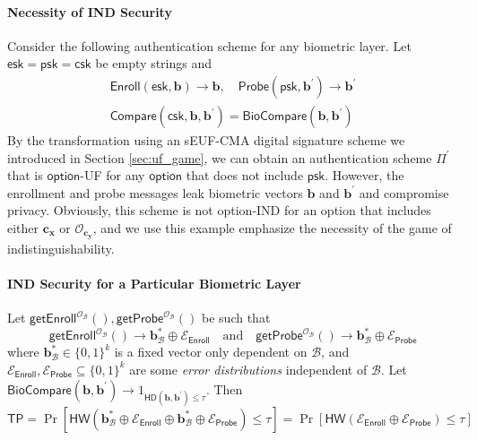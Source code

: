 \paragraph{Necessity of IND Security}
Consider the following authentication scheme for any biometric layer. Let $\textsf{esk} = \textsf{psk} = \textsf{csk}$ be empty strings and
\begin{gather*}
	\textsf{Enroll}(\textsf{esk}, \mathbf{b}) \to \mathbf{b}, \quad \textsf{Probe}(\textsf{psk}, \mathbf{b}^\prime ) \to \mathbf{b}^\prime \\
	\textsf{Compare}(\textsf{csk}, \mathbf{b}, \mathbf{b}^\prime) = \textsf{BioCompare}(\mathbf{b}, \mathbf{b}^\prime ) 
\end{gather*}
By the transformation using an sEUF-CMA digital signature scheme we introduced in Section \ref{sec:uf_game}, we can obtain an authentication scheme $\Pi^\prime$ that is $\textsf{option}$-UF for any $\textsf{option}$ that does not include $\textsf{psk}$.
However, the enrollment and probe messages leak biometric vectors $\mathbf{b}$ and $\mathbf{b}^\prime$ and compromise privacy. Obviously, this scheme is not \textsf{option}-IND for an \textsf{option} that includes either $\mathbf{c_x}$ or $\mathcal{O}_{\mathbf{c_y}}$, and we use this example emphasize the necessity of the game of indistinguishability.


\paragraph{IND Security for a Particular Biometric Layer}

Let $\textsf{getEnroll}^{\mathcal{O}_{\mathcal{B}}}(), \textsf{getProbe}^{\mathcal{O}_{\mathcal{B}}}()$ be such that
\[
	\textsf{getEnroll}^{\mathcal{O}_{\mathcal{B}}}() \to \mathbf{b}^*_{\mathcal{B}} \oplus \mathcal{E}_{\textsf{Enroll}}  \quad \text{and} \quad \textsf{getProbe}^{\mathcal{O}_{\mathcal{B}}}() \to \mathbf{b}^*_{\mathcal{B}} \oplus \mathcal{E}_{\textsf{Probe}}
\]
where $\mathbf{b}^*_{\mathcal{B}} \in \{0, 1\}^k$ is a fixed vector only dependent on $\mathcal{B}$, and $\mathcal{E}_{\textsf{Enroll}}, \mathcal{E}_{\textsf{Probe}} \subseteq \{0, 1\}^k$ are some \emph{error distributions} independent of $\mathcal{B}$. Let $\textsf{BioCompare}(\mathbf{b}, \mathbf{b}^\prime) \to 1_{\textsf{HD}(\mathbf{b}, \mathbf{b}^\prime) \leq \tau}$. Then
\[
	\textsf{TP} = \Pr[ \textsf{HW}(\mathbf{b}^*_{\mathcal{B}} \oplus \mathcal{E}_{\textsf{Enroll}} \oplus \mathbf{b}^*_{\mathcal{B}} \oplus \mathcal{E}_{\textsf{Probe}}) \leq \tau ] = \Pr[ \textsf{HW}(\mathcal{E}_{\textsf{Enroll}} \oplus \mathcal{E}_{\textsf{Probe}}) \leq \tau ]
\]


